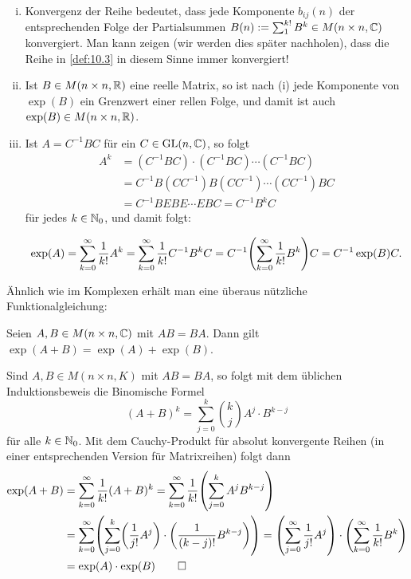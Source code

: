 \begin{bemerkung}
	\label{bem:10.4}
	\mbox{} \\[-1.4cm]
	\begin{enumerate}[(i)]
		\item Konvergenz der Reihe bedeutet, dass jede Komponente $b_{ij}(n)$ der entsprechenden Folge der Partialsummen $B(n) := \sum_{1}^{k!} B^{k} \in M(n \times n,\mathbb{C})$ konvergiert.
		Man kann zeigen (wir werden dies später nachholen), dass die Reihe in \autoref{def:10.3} in diesem Sinne immer konvergiert!
		\item Ist $B \in M(n \times n,\mathbb{R})$ eine reelle Matrix, so ist nach (i) jede Komponente von $\exp(B)$ ein Grenzwert einer rellen Folge, und damit ist auch $\exp(B) \in M(n \times n,\mathbb{R})$.
		\item Ist $A = C^{-1} BC$ für ein $C \in \operatorname{GL}(n,\mathbb{C})$, so folgt
		\begin{align*}
			A^{k} &= (C^{-1}BC)\cdot (C^{-1}BC) \cdots (C^{-1}BC) \\
			&= C^{-1} B (CC^{-1}) B (CC^{-1}) \cdots (CC^{-1})BC \\
			&= C^{-1} B E B E \cdots E BC = C^{-1} B^k C
		\end{align*}
		für jedes $k \in \mathbb{N}_0$, und damit folgt:
		
		\[
			\exp(A) = \sum\limits_{k=0}^{\infty} \frac{1}{k!} A^k = \sum_{k=0}^{\infty} \frac{1}{k!} C^{-1} B^{k} C = C^{-1} \enb{\sum_{k=0}^{\infty} \frac{1}{k!} B^{k}} C = C^{-1} \exp(B) C.
		\]
	\end{enumerate}
\end{bemerkung}

Ähnlich wie im Komplexen erhält man eine überaus nützliche Funktionalgleichung:

\begin{lemma}
	\label{lemma:10.5}
	Seien $A,B \in M(n \times n,\mathbb{C})$ mit $AB = BA$.
	Dann gilt $\exp(A+B) = \exp(A) + \exp(B)$.
\end{lemma}

\begin{beweis}[Skizze]
	Sind $A,B \in M(n \times n,K)$ mit $AB = BA$, so folgt mit dem üblichen Induktionsbeweis  die Binomische Formel
	\[
		(A+B)^{k} = \sum_{j=0}^{k} \binom{k}{j} A^{j} \cdot B^{k-j}
	\]
	für alle $k \in \mathbb{N}_0$.
	Mit dem Cauchy-Produkt für absolut konvergente Reihen (in einer entsprechenden Version für Matrixreihen) folgt dann
	\begin{align*}
		\exp(A+B) &= \sum_{k=0}^{\infty} \frac{1}{k!} (A+B)^k = \sum_{k=0}^{\infty} \frac{1}{k!} \enb{\sum_{j=0}^{k} A^{j} B^{k-j}} \\
		&= \sum_{k=0}^{\infty} \enb{\sum_{j=0}^{k} \enb{\frac{1}{j!} A^{j}} \cdot \enb{\frac{1}{(k-j)!} B^{k-j}}} = \enb{\sum_{j=0}^{\infty} \frac{1}{j!} A^{j}} \cdot \enb{\sum_{k=0}^{\infty} \frac{1}{k!} B^{k}} \\
		&= \exp(A) \cdot \exp(B) \qedhere
	\end{align*}
\end{beweis}


